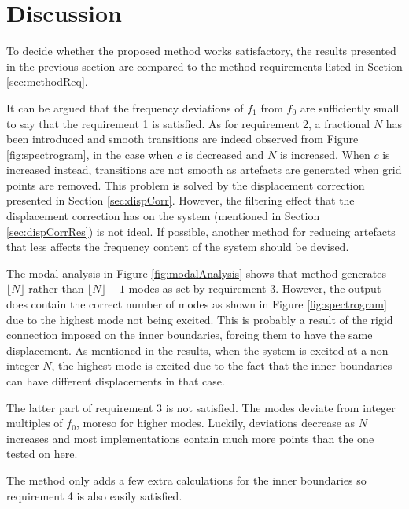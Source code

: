 \section{Discussion}
To decide whether the proposed method works satisfactory, the results presented in the previous section are compared to the method requirements listed in Section \eqref{sec:methodReq}. 

It can be argued that the frequency deviations of $f_1$ from $f_0$ are sufficiently small to say that the requirement 1 is satisfied. As for requirement 2, a fractional $N$ has been introduced and smooth transitions are indeed observed from Figure \ref{fig:spectrogram}, in the case when $c$ is decreased and $N$ is increased. When $c$ is increased instead, transitions are not smooth as artefacts are generated when grid points are removed. This problem is solved by the displacement correction presented in Section \ref{sec:dispCorr}. However, the filtering effect that the displacement correction has on the system (mentioned in Section \ref{sec:dispCorrRes}) is not ideal. If possible, another method for reducing artefacts that less affects the frequency content of the system should be devised. 

The modal analysis in Figure \ref{fig:modalAnalysis} shows that method generates $\lfloor N\rfloor$ rather than $\lfloor N\rfloor - 1$ modes as set by requirement 3. However, the output does contain the correct number of modes as shown in Figure \ref{fig:spectrogram} due to the highest mode not being excited. This is probably a result of the rigid connection imposed on the inner boundaries, forcing them to have the same displacement. As mentioned in the results, when the system is excited at a non-integer $N$, the highest mode is excited due to the fact that the inner boundaries can have different displacements in that case.

The latter part of requirement 3 is not satisfied. The modes deviate from integer multiples of $f_0$, moreso for higher modes. Luckily, deviations decrease as $N$ increases and most implementations contain much more points than the one tested on here. 

The method only adds a few extra calculations for the inner boundaries so requirement 4 is also easily satisfied. 


